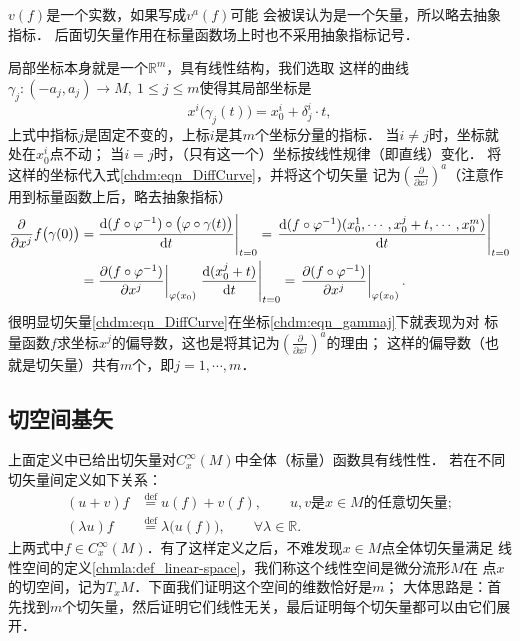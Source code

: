 \begin{remark}\label{chdm_rek-vnoa}
    $v(f)$是一个实数，如果写成$v^a(f)$可能
    会被误认为是一个矢量，所以略去抽象指标．
    后面切矢量作用在标量函数场上时也不采用抽象指标记号．
\end{remark}
局部坐标本身就是一个$\mathbb{R}^m$，具有线性结构，我们选取
这样的曲线$\gamma_j:(-a_j,a_j)\to M,\ 1\leqslant j \leqslant m$使得其局部坐标是
\begin{equation}\label{chdm:eqn_gammaj}
    x^i\bigl({\gamma_j}(t)\bigr)= x^i_0 + \delta^i _j \cdot t,
\end{equation}
上式中指标$j$是固定不变的，上标$i$是其$m$个坐标分量的指标．
当$i\neq j$时，坐标就处在$x^i_0$点不动；
当$i=j$时，（只有这一个）坐标按线性规律（即直线）变化．
将这样的坐标代入式\eqref{chdm:eqn_DiffCurve}，并将这个切矢量
记为$(\frac{\partial }{\partial x^j})^a$（注意作用到标量函数上后，略去抽象指标）
\begin{align*}
    \frac{\partial }{\partial x^j} f\bigl(\gamma (0)\bigr) =& \left. 
    \frac{{\rm d} (f \circ\varphi^{-1}) \circ\bigl(\varphi\circ \gamma (t)\bigr)}{{\rm d} t}  \right |_{t=0}
    =  \left. \frac{{\rm d} (f \circ\varphi^{-1}) (x^1_0,\cdots, x^j_0 + t, \cdots ,x^m_0)}{{\rm d} t}  \right |_{t=0}  \\
    =& \left.\frac{\partial (f \circ\varphi^{-1})}{\partial x^j}\right|_{\varphi(x_0)} 
    \left.\frac{{\rm d}(x^j_0 + t) }{{\rm d} t} \right|_{t=0}
    = \left.\frac{\partial (f \circ\varphi^{-1})}{\partial x^j}\right|_{\varphi(x_0)} .
\end{align*}
很明显切矢量\eqref{chdm:eqn_DiffCurve}在坐标\eqref{chdm:eqn_gammaj}下就表现为对
标量函数$f$求坐标$x^j$的偏导数，这也是将其记为$(\frac{\partial }{\partial x^j})^a$的理由；
这样的偏导数（也就是切矢量）共有$m$个，即$j=1,\cdots,m$．

\subsection{切空间基矢}
上面定义中已给出切矢量对$C^\infty_x(M)$中全体（标量）函数具有线性性．
若在不同切矢量间定义如下关系：
\begin{subequations}
    \begin{align}
        (u+v)f & \overset{\mathrm {def}}{=} u(f) + v(f),\qquad {\text {$u,v$是$x\in M$的任意切矢量}}; \\
        (\lambda u) f & \overset{\mathrm {def}}{=} \lambda \bigl( u(f)\bigr), \qquad \forall\lambda\in \mathbb{R}.
    \end{align}
\end{subequations}
上两式中$f\in C^\infty_x(M)$．有了这样定义之后，不难发现$x\in M$点{\kaishu 全体切矢量}满足
线性空间的定义\ref{chmla:def_linear-space}，我们称这个线性空间是微分流形$M$在
点$x$的{\heiti 切空间}，记为$T_x M$．下面我们证明这个空间的维数恰好是$m$；
大体思路是：首先找到$m$个切矢量，然后证明它们线性无关，最后证明每个切矢量都可以由它们展开．

